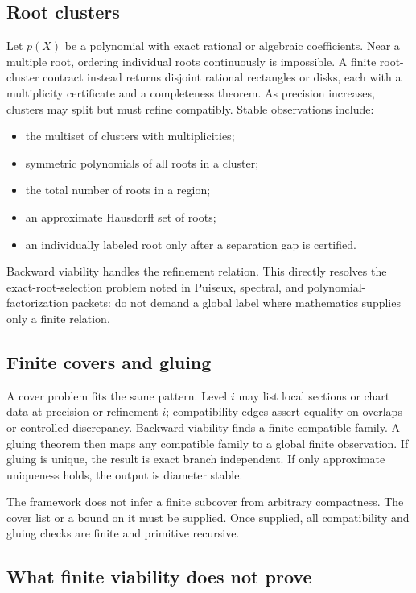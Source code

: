 \subsection{Root clusters}

Let \(p(X)\) be a polynomial with exact rational or algebraic coefficients.  Near a multiple root, ordering
individual roots continuously is impossible.  A finite root-cluster contract instead returns disjoint
rational rectangles or disks, each with a multiplicity certificate and a completeness theorem.  As
precision increases, clusters may split but must refine compatibly.  Stable observations include:
\begin{itemize}
  \item the multiset of clusters with multiplicities;
  \item symmetric polynomials of all roots in a cluster;
  \item the total number of roots in a region;
  \item an approximate Hausdorff set of roots;
  \item an individually labeled root only after a separation gap is certified.
\end{itemize}
Backward viability handles the refinement relation.  This directly resolves the exact-root-selection
problem noted in Puiseux, spectral, and polynomial-factorization packets: do not demand a global label where
mathematics supplies only a finite relation.

\subsection{Finite covers and gluing}

A cover problem fits the same pattern.  Level \(i\) may list local sections or chart data at precision or
refinement \(i\); compatibility edges assert equality on overlaps or controlled discrepancy.  Backward
viability finds a finite compatible family.  A gluing theorem then maps any compatible family to a global
finite observation.  If gluing is unique, the result is exact branch independent.  If only approximate
uniqueness holds, the output is diameter stable.

The framework does not infer a finite subcover from arbitrary compactness.  The cover list or a bound on it
must be supplied.  Once supplied, all compatibility and gluing checks are finite and primitive recursive.

\subsection{What finite viability does not prove}

